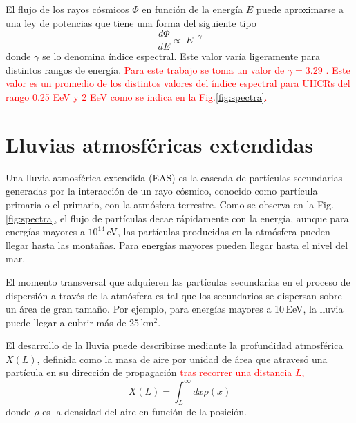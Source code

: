 El flujo de los rayos cósmicos $\Phi$ en función de la energía $E$ puede aproximarse a una ley de potencias que tiene una forma del siguiente tipo
\begin{equation}
	    \frac{d\Phi}{dE} \propto \ E^{-\gamma}   \label{eq:expresion1}
\end{equation}
donde $\gamma$ se lo denomina índice espectral. Este valor varía ligeramente para distintos rangos de energía. \textcolor{red}{Para este trabajo se toma un valor de $\gamma = 3.29$ \cite{como_funciona_auger}. Este valor es un promedio de los distintos valores del índice espectral para UHCRs del rango 0.25 EeV y 2 EeV como se indica en la Fig.\ref{fig:spectra}.}


\section{Lluvias atmosféricas extendidas}

Una lluvia atmosférica extendida (EAS) es la cascada de partículas secundarias generadas por la interacción de un rayo cósmico, conocido como partícula primaria o el primario, con la atmósfera terrestre. Como se observa en la Fig.\,\ref{fig:spectra}, el flujo de partículas decae rápidamente con la energía, aunque para energías mayores a $10^{14}\,$eV, las partículas producidas en la atmósfera pueden llegar hasta las montañas. Para energías mayores pueden llegar hasta el nivel del mar.

El momento transversal que adquieren las partículas secundarias en el proceso de dispersión a través de la atmósfera es tal que los secundarios se dispersan sobre un área de gran tamaño. Por ejemplo, para energías mayores a 10$\,$EeV,  la lluvia puede llegar a cubrir más de 25\,km$^2$. 

El desarrollo de la lluvia puede describirse mediante la profundidad atmosférica $X(L)$, definida como la masa de aire por unidad de área que atravesó una partícula en su dirección de propagación \textcolor{red}{tras recorrer una distancia $L$,} 
\begin{equation}
	X(L)= \int_L^\infty dx \rho(x)
\end{equation}
donde $\rho$ es la densidad del aire en función de la posición.


